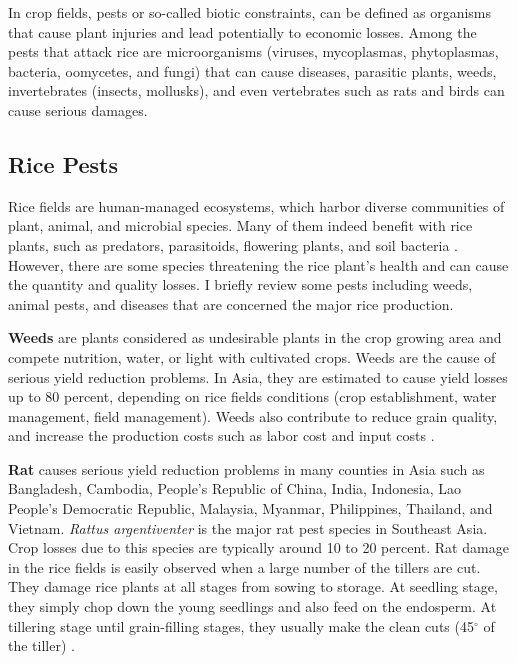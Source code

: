 \documentclass[12pt, oneside]{report}
\begin{document}
In crop fields, pests or so-called biotic constraints, can be defined as organisms that cause plant injuries and lead potentially to economic losses. Among the pests that attack rice are microorganisms (viruses, mycoplasmas, phytoplasmas, bacteria, oomycetes, and fungi) that can cause diseases, parasitic plants, weeds, invertebrates (insects, mollusks), and even vertebrates such as rats and birds can cause serious damages.

\subsection*{Rice Pests}

Rice fields are human-managed ecosystems, which harbor diverse communities of plant, animal, and microbial species. Many of them indeed benefit with rice plants, such as predators, parasitoids, flowering plants, and soil bacteria \citep{norton2010rice}. However, there are some species threatening the rice plant's health and can cause the quantity and quality losses. I briefly review some pests including weeds, animal pests, and diseases that are concerned the major rice production.


\textbf{Weeds} are plants considered as undesirable plants in the crop growing area and compete nutrition, water, or light with cultivated crops. Weeds are the cause of serious yield reduction problems. In Asia, they are estimated to cause yield losses up to 80 percent, depending on rice fields conditions (crop establishment, water management, field management). Weeds also contribute to reduce grain quality, and increase the production costs such as labor cost and input costs \citep{litsinger1991crop}.

\textbf{Rat} causes serious yield reduction problems in many counties in Asia such as Bangladesh, Cambodia, People's Republic of China, India, Indonesia, Lao People's Democratic Republic, Malaysia, Myanmar, Philippines, Thailand, and Vietnam. \textit{Rattus argentiventer} is the major rat pest species in Southeast Asia. Crop losses due to this species are typically around 10 to 20 percent. Rat damage in the rice fields is easily observed when a large number of the tillers are cut. They damage rice plants at all stages from sowing to storage. At seedling stage, they simply chop down the young seedlings and also feed on the endosperm. At tillering stage until grain-filling stages, they usually make the clean cuts (45$^{\circ}$ of the tiller) \citep{singleton2003impacts}. 
\end{document}
